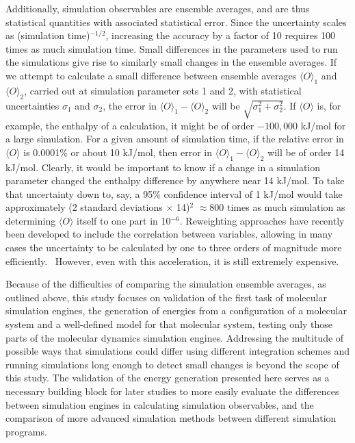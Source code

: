 Additionally, simulation observables are ensemble averages, and are
thus statistical quantities with associated statistical error. Since
the uncertainty scales as (simulation time)$^{-1/2}$, increasing the
accuracy by a factor of 10 requires 100 times as much simulation
time. Small differences in the parameters used to run the simulations
give rise to similarly small changes in the ensemble
averages. If we attempt to calculate a small difference between
ensemble averages $\langle O \rangle_1$ and $\langle O \rangle_2$,
carried out at simulation parameter sets 1 and 2, with statistical
uncertainties $\sigma_1$ and $\sigma_2$, the error in $\langle O
\rangle_1 - \langle O \rangle_2$ will be
$\sqrt{\sigma_1^2+\sigma_2^2}$. If $\langle O \rangle$ is, for
example, the enthalpy of a calculation, it might be of order
$-100,000$ kJ/mol for a large simulation.  For a given amount of
simulation time, if the relative error in $\langle O \rangle$ is
0.0001\% or about 10 kJ/mol, then error in $\langle O\rangle_1 -
\langle O \rangle_2$ will be of order 14 kJ/mol. Clearly, it would be
important to know if a change in a simulation parameter changed the
enthalpy difference by anywhere near 14 kJ/mol. To take that
uncertainty down to, say, a 95\% confidence interval of 1 kJ/mol would
take approximately (2 standard deviations $\times$ 14)$^2$ $\approx 800$ times as much
simulation as determining $\langle O \rangle$ itself to one part in
10$^{-6}$.  Reweighting approaches have recently been developed to
include the correlation between variables, allowing in many cases the
uncertainty to be calculated by one to three orders of magnitude more
efficiently.~\citep{Paliwal2013} However, even with this acceleration,
it is still extremely expensive.

Because of the difficulties of comparing the simulation ensemble
averages, as outlined above, this study focuses on validation of the
first task of molecular simulation engines, the generation of energies
from a configuration of a molecular system and a well-defined model
for that molecular system, testing only those parts of the molecular
dynamics simulation engines.  Addressing the multitude of possible ways
that simulations could differ using different integration schemes and
running simulations long enough to detect small changes is beyond the
scope of this study. The validation of the energy generation presented
here serves as a necessary building block for later studies to more
easily evaluate the differences between simulation engines in
calculating simulation observables, and the comparison of more
advanced simulation methods between different simulation programs.

